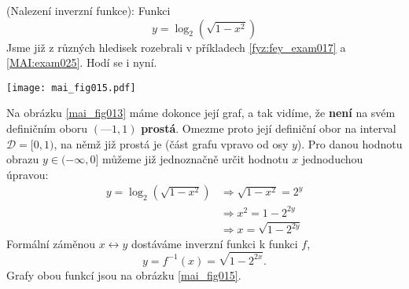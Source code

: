 \wikitextrule
\begin{example}\label{MAI:exam027}
  (Nalezení inverzní funkce): Funkci 
  \begin{equation*}
    y = \log_2(\sqrt{1-x^2})
  \end{equation*}
   Jsme již z různých hledisek rozebrali v příkladech \ref{fyz:fey_exam017} a \ref{MAI:exam025}. 
   Hodí se i nyní.

  {\centering
   \captionsetup{type=figure}
%  
   \texttt{[image: mai\_fig015.pdf]} 
  \par}
  
   Na obrázku \ref{mai_fig013} máme dokonce její graf, a tak vidíme, že \textbf{není} na svém 
   definičním oboru \((—1, 1)\) \textbf{prostá}. Omezme proto její definiční obor na interval 
   \( \mathcal{D} = [0, 1)\), na němž již prostá je (část grafu vpravo od osy \(y\)). Pro danou 
   hodnotu obrazu \(y \in (-\infty,0]\) můžeme již jednoznačně určit hodnotu \(x\) jednoduchou 
   úpravou:
   \begin{align*}
     y = \log_2(\sqrt{1-x^2}) &\Rightarrow \sqrt{1-x^2} = 2^y   \\
                              &\Rightarrow x^2 = 1 - 2^{2y}     \\
                              &\Rightarrow x = \sqrt{1 - 2^{2y}}
   \end{align*}
   Formální záměnou \(x \leftrightarrow y\) dostáváme inverzní funkci k funkci \(f\),
   \begin{equation*}
     y =f^{-1}(x) = \sqrt{1 - 2^{2x}}.
   \end{equation*}
   Grafy obou funkcí jsou na obrázku \ref{mai_fig015}.
\end{example}















